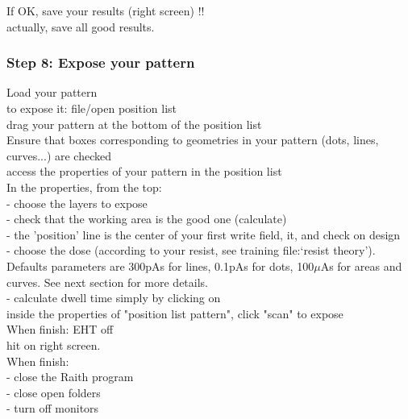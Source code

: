 \documentclass[12pt,a4paper]{report}
\begin{document}
\begin{enumerate}
If OK, save your results (right screen) !!\\
actually, save all good results.\\



\subsubsection{Step 8: Expose your pattern}

Load your pattern\\

to expose it: file/open position list\\

drag your pattern at the bottom of the position list \\

Ensure that boxes corresponding to geometries in your pattern (dots, lines, curves...) are checked\\

access the properties of your pattern in the position list\\

In the properties, from the top:\\
- choose the layers to expose\\
- check that the working area is the good one (calculate)\\
- the 'position' line is the center of your first write field,  it, and check on design \\
- choose the dose (according to your resist, see training file:`resist theory'). Defaults parameters are 300pAs for lines, 0.1pAs for dots, 100$\mu$As for areas and curves. See next section for more details. \\
- calculate dwell time simply by clicking on \\

inside the properties of "position list pattern", click "scan" to expose\\

When finish: EHT off\\

hit  on right screen.\\

When finish:\\
- close the Raith program\\
- close open folders\\
- turn off monitors\\



\end{enumerate}
\end{document}
